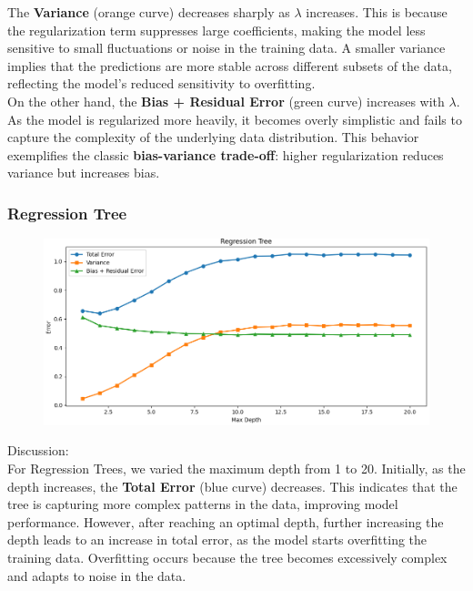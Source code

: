 \documentclass[a4paper,10pt]{article}
\begin{document}
The \textbf{Variance} (orange curve) decreases sharply as \(\lambda\) increases. This is because the regularization term suppresses large coefficients, making the model less sensitive to small fluctuations or noise in the training data. A smaller variance implies that the predictions are more stable across different subsets of the data, reflecting the model's reduced sensitivity to overfitting.\\

On the other hand, the \textbf{Bias + Residual Error} (green curve) increases with \(\lambda\). As the model is regularized more heavily, it becomes overly simplistic and fails to capture the complexity of the underlying data distribution. This behavior exemplifies the classic \textbf{bias-variance trade-off}: higher regularization reduces variance but increases bias.\\

\subsubsection{Regression Tree}

\begin{figure}[H]
    \centering
    \includegraphics[width=1\linewidth]{zzzz.png}
\end{figure}

Discussion:\\

For Regression Trees, we varied the maximum depth from 1 to 20. Initially, as the depth increases, the \textbf{Total Error} (blue curve) decreases. This indicates that the tree is capturing more complex patterns in the data, improving model performance. However, after reaching an optimal depth, further increasing the depth leads to an increase in total error, as the model starts overfitting the training data. Overfitting occurs because the tree becomes excessively complex and adapts to noise in the data.\\
\end{document}
